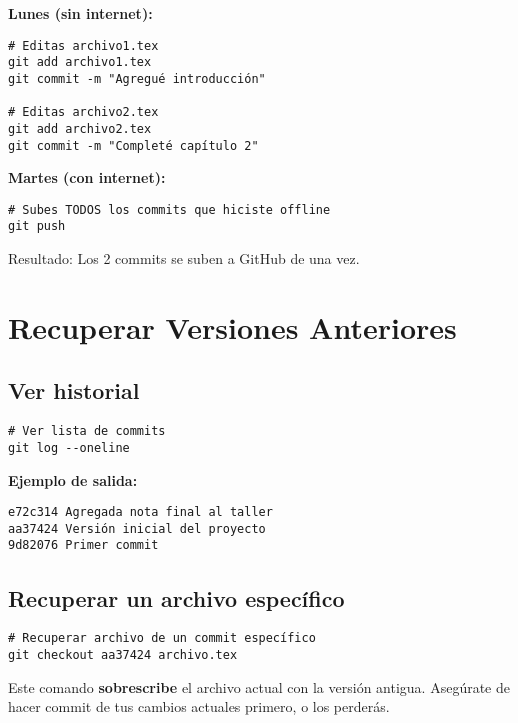 \documentclass[12pt,a4paper]{article}
\begin{document}
\begin{infobox}
\textbf{Lunes (sin internet):}
\begin{lstlisting}[style=bashstyle]
# Editas archivo1.tex
git add archivo1.tex
git commit -m "Agregué introducción"

# Editas archivo2.tex
git add archivo2.tex
git commit -m "Completé capítulo 2"
\end{lstlisting}

\textbf{Martes (con internet):}
\begin{lstlisting}[style=bashstyle]
# Subes TODOS los commits que hiciste offline
git push
\end{lstlisting}

Resultado: Los 2 commits se suben a GitHub de una vez.
\end{infobox}

\section{Recuperar Versiones Anteriores}

\subsection{Ver historial}

\begin{lstlisting}[style=bashstyle]
# Ver lista de commits
git log --oneline
\end{lstlisting}

\textbf{Ejemplo de salida:}
\begin{lstlisting}[style=bashstyle]
e72c314 Agregada nota final al taller
aa37424 Versión inicial del proyecto
9d82076 Primer commit
\end{lstlisting}

\subsection{Recuperar un archivo específico}

\begin{lstlisting}[style=bashstyle]
# Recuperar archivo de un commit específico
git checkout aa37424 archivo.tex
\end{lstlisting}

\begin{warningbox}[¡Atención!]
Este comando \textbf{sobrescribe} el archivo actual con la versión antigua. Asegúrate de hacer commit de tus cambios actuales primero, o los perderás.
\end{warningbox}
\end{document}
